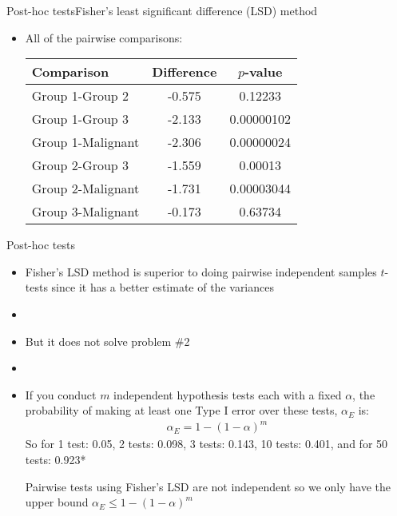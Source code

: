 \documentclass[xcolor=dvipsnames]{beamer}
\begin{document}
\begin{frame}{Post-hoc tests}{Fisher's least significant difference (LSD) method}
	\begin{itemize}
		\item All of the pairwise comparisons: \pause
		\vspace{4mm}
		\begin{center}
			\begin{tabular}{|l|c|c|}
				\hline
				\textbf{Comparison} & \textbf{Difference} & $p$-value \\   \hline \hline    
				Group 1-Group 2  &  -0.575 &    0.12233    \\ \hline
				Group 1-Group 3 &   -2.133  & 0.00000102 \\ \hline
				Group 1-Malignant & -2.306 & 0.00000024 \\ \hline
				Group 2-Group 3  &  -1.559 &    0.00013 \\ \hline
				Group 2-Malignant  & -1.731 & 0.00003044 \\ \hline
				Group 3-Malignant & -0.173 &   0.63734 \\ \hline
			\end{tabular}
		\end{center}
	\end{itemize}
\end{frame}

\begin{frame}{Post-hoc tests}
\begin{itemize}
	\item Fisher's LSD method is superior to doing pairwise independent samples $t$-tests since it has a better estimate of the variances \pause
	\item[]
	\item But it does not solve problem \#2 \pause
	\item[]
	\item If you conduct $m$ independent hypothesis tests each with a fixed $\alpha$, the probability of making at least one Type I error over these tests, $\alpha_E$ is: \pause
	\begin{gather*}
		\alpha_E = 1-(1-\alpha)^m
	\end{gather*} \pause
	So for 1 test: 0.05, 2 tests: 0.098, 3 tests: 0.143, 10 tests: 0.401, and for 50 tests: 0.923* \pause
	
	\vspace{1mm}
	{\tiny *Pairwise tests using Fisher's LSD are not independent so we only have the upper bound $\alpha_E\leq 1-(1-\alpha)^m$}
\end{itemize}
\end{frame}
\end{document}
